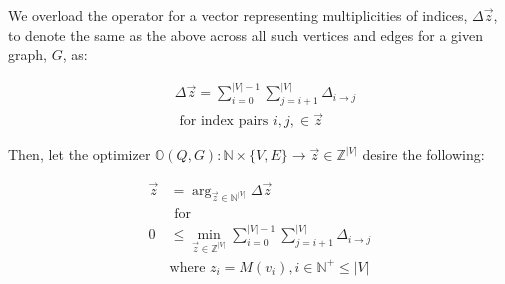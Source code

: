 \documentclass{article}
\DeclareMathOperator*{\argument}{arg}
\begin{document}
We overload the operator for a vector representing multiplicities of indices, $\Delta \vec{z}$, to denote the same as the above across all such vertices and edges for a given graph, $G$, as:

\begin{align*}
&\Delta \vec{z} = \sum\limits_{i=0}^{|V|-1} \sum\limits_{j=i+1}^{|V|} \Delta_{i \rightarrow j}\\
&\text{ for index pairs } i, j, \in \vec{z}
\end{align*}


Then, let the optimizer $\mathbb{O}(Q, G): \mathbb{N} \times \{ V, E\} \rightarrow \vec{z} \in \mathbb{Z}^{|V|}$ desire the following:

\begin{align*}
    \vec{z}& = \argument_{\vec{z} \in \mathbb{N}^{|V|}}\Delta \vec{z}\\
    & \text{ for } \\
    0 & \leq \min_{\vec{z} \in \mathbb{Z}^{|V|}} \sum\limits_{i = 0}^{|V|-1} \sum\limits_{j=i+1}^{|V|} \Delta_{i \rightarrow j}\\
    & \text{where } z_i = M(v_i), i \in \mathbb{N}^+ \leq |V|\\
\end{align*}
\end{document}
